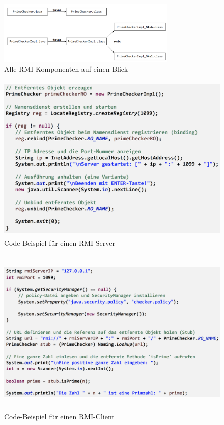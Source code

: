 \documentclass[a4paper]{article}
\begin{document}
			\newpage
			
				\begin{figure}[!htb]
					\centering
					\includegraphics[keepaspectratio, height=3cm]{img/rmi/rmi_components.png}
					\caption{Alle RMI-Komponenten auf einen Blick}
					\label{fig:rmi_components}
				\end{figure}
			
				\begin{figure}[!htb]
					\centering
					\includegraphics[keepaspectratio, height=8cm]{img/rmi/rmi_server.png}
					\caption{Code-Beispiel für einen RMI-Server}
					\label{fig:rmi_server}
				\end{figure}
			
				\begin{figure}[!htb]
					\centering
					\includegraphics[keepaspectratio, height=8cm]{img/rmi/rmi_client.png}
					\caption{Code-Beispiel für einen RMI-Client}
					\label{fig:rmi_client}
				\end{figure}
	
\end{document}
